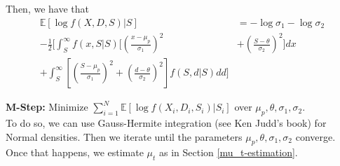 \documentclass[11pt, oneside]{article}   	%
\theoremstyle{ModifiedStyle}
\begin{document}
			Then, we have that
			\begin{align*}
				\mathbb{E}[\log f(X,D,S) | S] &= -\log \sigma_1 - \log \sigma_2 \\
				-\frac{1}{2}[\int_S^\infty f(x,S|S)[(\frac{x-\mu_p}{\sigma_1})^2 &+ (\frac{S-\theta}{\sigma_2})^2]dx \\
				+ \int_S^\infty [(\frac{S-\mu_p}{\sigma_1})^2 + (\frac{d-\theta}{\sigma_2})^2]f(S,d|S) dd]
			\end{align*}

			\noindent \textbf{M-Step:} Minimize $\sum_{i=1}^N \mathbb{E}[\log f(X_i,D_i,S_i)|S_i]$ over $\mu_p,\theta,\sigma_1,\sigma_2$. \\
			To do so, we can use Gauss-Hermite integration (see Ken Judd's book) for Normal densities. Then we iterate until the parameters $\mu_p,\theta,\sigma_1,\sigma_2$ converge. Once that happens, we estimate $\mu_t$ as in Section \ref{mu_t-estimation}.
\end{document}
